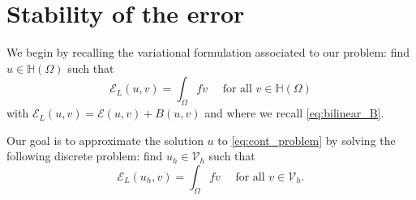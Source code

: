 \documentclass[11 pt]{article}
\numberwithin{equation}{section}
\def\cE{\mathcal{E}}
\begin{document}
\section{Stability of the error}\label{sec:error}

We begin by recalling the variational formulation associated to our problem: find $u\in\mathbb H(\Omega)$ such that 
%
\begin{equation}\label{eq:cont_problem}
    \cE_{L}(u,v)=\int_{\Omega}f v \quad \text{ for all } v\in \mathbb H(\Omega)
\end{equation}
%
with $\cE_{L}(u,v)=\cE(u,v)+B(u,v)$ and where we recall \eqref{eq:bilinear_B}.

Our goal is to approximate the solution $u$ to \eqref{eq:cont_problem} by solving the following discrete problem: find $u_h\in \mathcal V_h$ such that
%
\begin{equation}\label{eq:discr_problem}
    \cE_{L}(u_h,v)=\int_{\Omega} f v \quad \text{ for all } v\in \mathcal V_h.
\end{equation}
%
\end{document}
